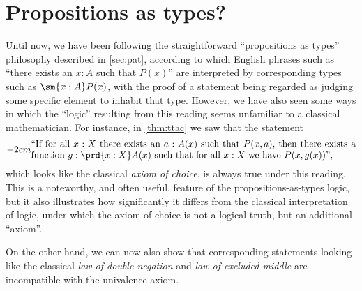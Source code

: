 \section{Propositions as types?}
\label{subsec:pat?}

%
%
%
Until now, we have been following the straightforward ``propositions as types'' philosophy described in \cref{sec:pat}, according to which English phrases such as ``there exists an $x:A$ such that $P(x)$'' are interpreted by corresponding types such as $\sm{x:A} P(x)$, with the proof of a statement being regarded as judging some specific element to inhabit that type.
However, we have also seen some ways in which the ``logic'' resulting from this reading seems unfamiliar to a classical mathematician.
For instance, in \cref{thm:ttac} we saw that the statement
%
\begin{equation}\label{eq:english-ac}
  \parbox{\textwidth-2cm}{``If for all $x:X$ there exists an $a:A(x)$ such that $P(x,a)$, then there exists a function $g:\prd{x:X} A(x)$ such that for all $x:X$ we have $P(x,g(x))$'',}
\end{equation}
which looks like the classical \emph{axiom of choice}, is always true under this reading. This is a noteworthy, and often useful, feature of the propositions-as-types logic, but it also illustrates how significantly it differs from the classical interpretation of logic, under which the axiom of choice is not a logical truth, but an additional ``axiom''.

On the other hand, we can now also show that corresponding statements looking like the classical \emph{law of double negation} and \emph{law of excluded middle} are incompatible with the univalence axiom.
%

